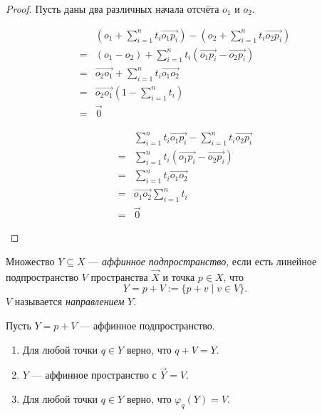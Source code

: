 \documentclass[12pt,a4paper]{article}
\begin{document}
    \begin{proof}
        Пусть даны два различных начала отсчёта $o_1$ и $o_2$.

        \begin{enumerate}
            \begin{multicols}{2}
                \item 
                    \begin{align*}
                        &\left(o_1 + \sum_{i=1}^n t_i \overrightarrow{o_1 p_i}\right) - \left(o_2 + \sum_{i=1}^n t_i \overrightarrow{o_2 p_i}\right)\\
                        =&(o_1 - o_2) + \sum_{i=1}^n t_i (\overrightarrow{o_1 p_i} - \overrightarrow{o_2 p_i})\\
                        =&\overrightarrow{o_2 o_1} + \sum_{i=1}^n t_i \overrightarrow{o_1 o_2}\\
                        =&\overrightarrow{o_2 o_1} \left(1 - \sum_{i=1}^n t_i\right)\\
                        =&\overrightarrow{0}
                    \end{align*}
                \item 
                    \begin{align*}
                        &\sum_{i=1}^n t_i \overrightarrow{o_1 p_i} - \sum_{i=1}^n t_i \overrightarrow{o_2 p_i}\\
                        =&\sum_{i=1}^n t_i (\overrightarrow{o_1 p_i} - \overrightarrow{o_2 p_i})\\
                        =&\sum_{i=1}^n t_i \overrightarrow{o_1 o_2}\\
                        =&\overrightarrow{o_1 o_2} \sum_{i=1}^n t_i\\
                        =&\overrightarrow{0}
                    \end{align*}
            \end{multicols}
        \end{enumerate}
    \end{proof}

    \begin{definition}
        Множество $Y \subseteq X$ --- \emph{аффинное подпространство}, если есть линейное подпространство $V$ пространства $\overrightarrow{X}$ и точка $p \in X$, что
        \[Y = p + V := \{p + v \mid v \in V\}.\]
        $V$ называется \emph{направлением} $Y$.
    \end{definition}

    \begin{lemma}
        Пусть $Y = p + V$ --- аффинное подпространство.
        \begin{enumerate}
            \item Для любой точки $q \in Y$ верно, что $q + V = Y$.
            \item $Y$ --- аффинное пространство с $\overrightarrow{Y} = V$.
            \item Для любой точки $q \in Y$ верно, что $\varphi_q(Y) = V$.
        \end{enumerate}
    \end{lemma}
\end{document}
